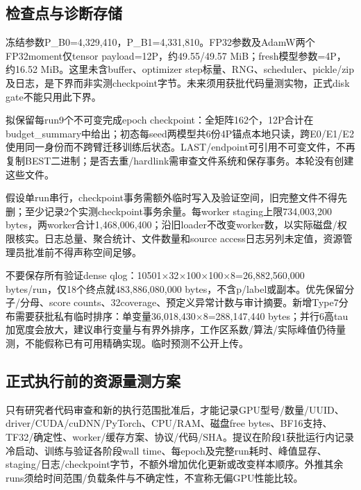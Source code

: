 \documentclass[UTF8,fontset=fandol,10pt]{ctexart}
\begin{document}
\subsection{检查点与诊断存储}

冻结参数P\_\allowbreak{}B0=4,329,410，P\_\allowbreak{}B1=4,331,810。FP32参数及AdamW两个FP32moment仅tensor payload=12P，约49.55/\allowbreak{}49.57 MiB；fresh模型参数=4P，约16.52 MiB。这里未含buffer、optimizer step标量、RNG、scheduler、pickle/\allowbreak{}zip及日志，是下界而非实测checkpoint字节。未来须用获批代码量测实物，正式disk gate不能只用此下界。

拟保留每run9个不可变完成epoch checkpoint：全矩阵162个，12P合计在budget\_\allowbreak{}summary中给出；初态每seed两模型共6份4P锚点本地只读，跨E0/\allowbreak{}E1/\allowbreak{}E2使用同一身份而不跨臂迁移训练后状态。LAST/\allowbreak{}endpoint可引用不可变文件，不再复制BEST二进制；是否去重/\allowbreak{}hardlink需审查文件系统和保存事务。本轮没有创建这些文件。

假设单run串行，checkpoint事务需额外临时写入及验证空间，旧完整文件不得先删；至少记录2个实测checkpoint事务余量。每worker staging上限734,003,200 bytes，两worker合计1,468,006,400；沿旧loader不改变worker数，以实际磁盘/\allowbreak{}权限核实。日志总量、聚合统计、文件数量和source access日志另列未定值，资源管理员批准前不得声称空间足够。

不要保存所有验证dense qlog：10501\(\times\)32\(\times\)100\(\times\)100\(\times\)8=26,882,560,000 bytes/\allowbreak{}run，仅18个终点就483,886,080,000 bytes，不含p/\allowbreak{}label或副本。优先保留分子/\allowbreak{}分母、score counts、32coverage、预定义异常计数与审计摘要。新增Type7分布需要获批私有临时排序：单变量36,018,430\(\times\)8=288,147,440 bytes；并行6高tau加宽度会放大，建议串行变量与有界外排序，工作区系数/\allowbreak{}算法/\allowbreak{}实际峰值仍待量测，不能假称已有可用精确实现。临时预测不公开上传。

\subsection{正式执行前的资源量测方案}

只有研究者代码审查和新的执行范围批准后，才能记录GPU型号/\allowbreak{}数量/\allowbreak{}UUID、driver/\allowbreak{}CUDA/\allowbreak{}cuDNN/\allowbreak{}PyTorch、CPU/\allowbreak{}RAM、磁盘free bytes、BF16支持、TF32/\allowbreak{}确定性、worker/\allowbreak{}缓存方案、协议/\allowbreak{}代码/\allowbreak{}SHA。提议在阶段1获批运行内记录冷启动、训练与验证各阶段wall time、每epoch及完整run耗时、峰值显存、staging/\allowbreak{}日志/\allowbreak{}checkpoint字节，不额外增加优化更新或改变样本顺序。外推其余runs须给时间范围/\allowbreak{}负载条件与不确定性，不宣称无偏GPU性能比较。
\end{document}
